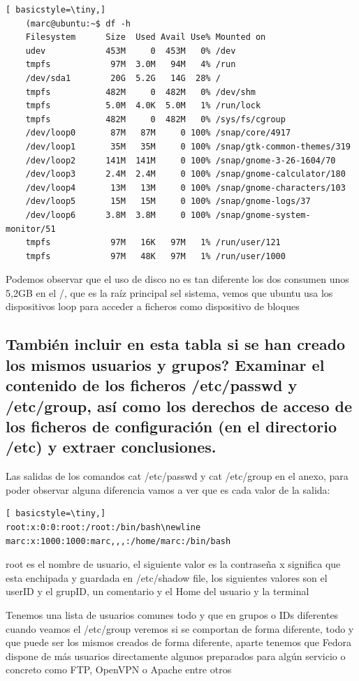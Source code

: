 \documentclass[preprint,11pt]{elsarticle}
\begin{document}
\begin{lstlisting}[ basicstyle=\tiny,]
    (marc@ubuntu:~$ df -h
    Filesystem      Size  Used Avail Use% Mounted on
    udev            453M     0  453M   0% /dev
    tmpfs            97M  3.0M   94M   4% /run
    /dev/sda1        20G  5.2G   14G  28% /
    tmpfs           482M     0  482M   0% /dev/shm
    tmpfs           5.0M  4.0K  5.0M   1% /run/lock
    tmpfs           482M     0  482M   0% /sys/fs/cgroup
    /dev/loop0       87M   87M     0 100% /snap/core/4917
    /dev/loop1       35M   35M     0 100% /snap/gtk-common-themes/319
    /dev/loop2      141M  141M     0 100% /snap/gnome-3-26-1604/70
    /dev/loop3      2.4M  2.4M     0 100% /snap/gnome-calculator/180
    /dev/loop4       13M   13M     0 100% /snap/gnome-characters/103
    /dev/loop5       15M   15M     0 100% /snap/gnome-logs/37
    /dev/loop6      3.8M  3.8M     0 100% /snap/gnome-system-monitor/51
    tmpfs            97M   16K   97M   1% /run/user/121
    tmpfs            97M   48K   97M   1% /run/user/1000

\end{lstlisting}
Podemos observar que el uso de disco no es tan diferente los dos consumen unos 5,2GB en el /, que es la raíz principal sel sistema, vemos que ubuntu usa los dispositivos loop para acceder a ficheros como dispositivo de bloques 

\subsection{También incluir en esta tabla si se han creado los mismos usuarios y grupos? Examinar el contenido de los ficheros /etc/passwd y /etc/group, así como los derechos de acceso de los ficheros de configuración (en el directorio /etc) y extraer conclusiones.}

Las salidas de los comandos cat /etc/passwd y cat /etc/group en el anexo, para poder observar alguna diferencia vamos a ver que es cada valor de la salida:
\begin{lstlisting}[ basicstyle=\tiny,]
root:x:0:0:root:/root:/bin/bash\newline
marc:x:1000:1000:marc,,,:/home/marc:/bin/bash
\end{lstlisting}
root es el nombre de usuario, el siguiente valor es la contraseña x significa que esta enchipada y guardada en /etc/shadow file, los siguientes valores son el userID y el grupID, un comentario y el Home del usuario y la terminal

Tenemos una lista de usuarios comunes todo y que en grupos o IDs diferentes cuando veamos el /etc/group veremos si se comportan de forma diferente, todo y que puede ser los mismos creados de forma diferente, aparte tenemos que Fedora dispone de más usuarios directamente algunos preparados para algún servicio o concreto como FTP, OpenVPN o Apache entre otros
\end{document}
